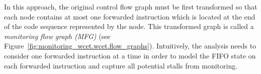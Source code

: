 In this approach, the original control flow graph must be first transformed so that
each node contains at most one forwarded instruction which is located at the
end of the code sequence represented by the node.  This transformed graph is
called a {\em monitoring flow graph (MFG)} (see
Figure~\ref{fig:monitoring_wcet.wcet.flow_graphs}).  Intuitively, the analysis
needs to
consider one forwarded instruction at a time in order to model the FIFO state
on each forwarded instruction and capture all potential stalls from monitoring. 

